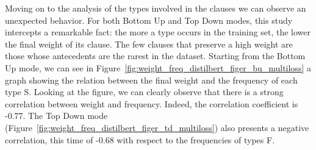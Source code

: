Moving on to the analysis of the types involved in the clauses we can observe an unexpected behavior. For both Bottom Up and Top Down modes, this study intercepts a remarkable fact: the more a type occurs in the training set, the lower the final weight of its clause. The few clauses that preserve a high weight are those whose antecedents are the rarest in the dataset. Starting from the Bottom Up mode, we can see in Figure~\ref{fig:weight_freq_distilbert_figer_bu_multiloss} a graph showing the relation between the final weight and the frequency of each type S. Looking at the figure, we can clearly observe that there is a strong correlation between weight and frequency. Indeed, the correlation coefficient is -0.77. The Top Down mode (Figure~\ref{fig:weight_freq_distilbert_figer_td_multiloss}) also presents a negative correlation, this time of -0.68 with respect to the frequencies of types F.

